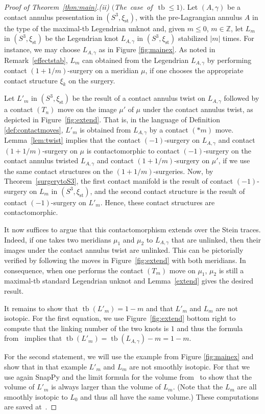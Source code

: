 \documentclass[11pt]{amsart} %
\DeclareMathOperator{\tb}{tb}
\newcommand{\Z}{\mathbb{Z}}
\newcommand{\xist}{\xi_{\mathrm{st}}}
\theoremstyle{plain}
\theoremstyle{definition}
\begin{document}
\begin{proof}[Proof of Theorem~\ref{thm:main}.(ii) $($\mbox{The case of }$\tb\leq1)$]
Let $(A,\gamma)$ be a contact annulus presentation in $(S^3,\xist)$, with the pre-Lagrangian annulus $A$ in the type of the maximal-tb Legendrian unknot and, given $m\leq 0$, $m\in\Z$, let $L_m$ in $(S^3,\xist)$ be the Legendrian knot $L_{A,\gamma}$ in $(S^3,\xist)$ stabilized $|m|$ times. For instance, we may choose $L_{A,\gamma}$ as in Figure \ref{fig:mainex}. As noted in Remark~\ref{effectstab}, $L_m$ can obtained from the Legendrian $L_{A,\gamma}$ by performing contact $(1+1/m)$-surgery on a meridian $\mu$, if one chooses the appropriate contact structure $\xi_k$ on the surgery.

Let $L'_m$ in $(S^3,\xist)$ be the result of a contact annulus twist on $L_{A,\gamma}$ followed by a contact $(T_n)$ move on the image $\mu'$ of $\mu$ under the contact annulus twist, as depicted in Figure~\ref{fig:extend}. That is, in the language of Definition \ref{def:contactmoves}, $L'_m$ is obtained from $L_{A,\gamma}$ by a contact $(*m)$ move. Lemma~\ref{lem:twist} implies that the contact $(-1)$-surgery on $L_{A,\gamma}$ and contact $(1+1/m)$-surgery on $\mu$ is contactomorphic to contact $(-1)$-surgery on the contact annulus twisted $L_{A,\gamma}$ and contact $(1+1/m)$-surgery on $\mu'$, if we use the same contact structures on the $(1+1/m)$-surgeries. Now, by Theorem~\ref{surgerytoS3}, the first contact manifold is the result of contact $(-1)$-surgery on $L_m$ in $(S^3,\xist)$, and the second contact structure is the result of contact $(-1)$-surgery on $L'_m$. Hence, these contact structures are contactomorphic. 

It now suffices to argue that this contactomorphism extends over the Stein traces. Indeed, if one takes two meridians $\mu_1$ and $\mu_2$ to $L_{A,\gamma}$ that are unlinked, then their images under the contact annulus twist are unlinked. This can be pictorially verified by following the moves in Figure~\ref{fig:extend} with both meridians. In consequence, when one performs the contact $(T_m)$ move on $\mu_1$, $\mu_2$ is still a maximal-tb standard Legendrian unknot and Lemma~\ref{extend} gives the desired result.

It remains to show that $\tb(L'_m)=1-m$ and that $L'_m$ and $L_m$ are not isotopic. For the first equation, we use Figure~\ref{fig:extend} bottom right to compute that the linking number of the two knots is $1$ and thus the formula from~\cite[Lemma 6.2]{Kegel18} implies that $\tb(L'_m)=\tb(L_{A,\gamma})-m=1-m$. 

For the second statement, we will use the example from Figure \ref{fig:mainex} and show that in that example $L'_m$ and $L_m$ are not smoothly isotopic. For that we use again SnapPy and the limit formula for the volume from~\cite{NeumannZagier85} to show that the volume of $L'_m$ is always larger than the volume of $L_m$. (Note that the $L_m$ are all smoothly isotopic to $L_0$ and thus all have the same volume.) These computations are saved at~\cite{CasalsEtnyreKegel}.
\end{proof}
\end{document}
